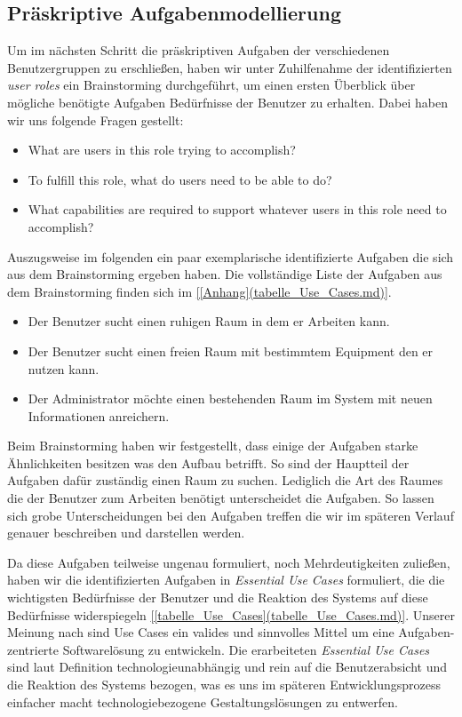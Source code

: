 \subsection{Präskriptive Aufgabenmodellierung}
\label{sec:Präskriptive_Aufgabenmodellierung}

Um im nächsten Schritt die präskriptiven Aufgaben der verschiedenen
Benutzergruppen zu erschließen, haben wir unter Zuhilfenahme der
identifizierten \textit{user roles} ein Brainstorming durchgeführt, um einen
ersten Überblick über mögliche benötigte Aufgaben \bzw Bedürfnisse der Benutzer
zu erhalten.
Dabei haben wir uns folgende Fragen gestellt:

\begin{itemize}
	\item What are users in this role trying to accomplish?
	\item To fulfill this role, what do users need to be able to do?
	\item What capabilities are required to support whatever users in this role need to accomplish?\\
	\citep[Seite 116,Zeile 7-9]{softwareForUse}
\end{itemize}


Auszugsweise im folgenden ein paar exemplarische identifizierte Aufgaben die
sich aus dem Brainstorming ergeben haben. Die vollständige Liste der Aufgaben
aus dem Brainstorming finden sich im \ref{[Anhang](tabelle_Use_Cases.md)}.

\begin{itemize}
	\item Der Benutzer sucht einen ruhigen Raum in dem er Arbeiten kann.
	\item Der Benutzer sucht einen freien Raum mit bestimmtem Equipment den er nutzen kann.
	\item Der Administrator möchte einen bestehenden Raum im System mit neuen Informationen anreichern.
\end{itemize}

Beim Brainstorming haben wir festgestellt, dass einige der Aufgaben  starke
Ähnlichkeiten besitzen was den Aufbau betrifft. So sind der Hauptteil der
Aufgaben dafür zuständig einen Raum zu suchen. Lediglich die Art des Raumes die
der Benutzer zum Arbeiten benötigt unterscheidet die Aufgaben. So lassen sich
grobe Unterscheidungen bei den Aufgaben treffen die wir im späteren Verlauf
genauer beschreiben und darstellen werden.

Da diese Aufgaben teilweise ungenau formuliert, \bzw noch Mehrdeutigkeiten
zuließen, haben wir die identifizierten Aufgaben in \textit{Essential Use Cases}
formuliert, die die wichtigsten Bedürfnisse der Benutzer und die Reaktion des
Systems auf diese Bedürfnisse widerspiegeln \ref{[tabelle_Use_Cases](tabelle_Use_Cases.md)}.
Unserer Meinung nach sind Use Cases ein valides und sinnvolles Mittel um eine
Aufgaben-zentrierte Softwarelösung zu entwickeln.
Die erarbeiteten \textit{Essential Use Cases} sind laut Definition \citep[Kapitel~5]{softwareForUse}
technologieunabhängig und rein auf die Benutzerabsicht und die Reaktion des
Systems bezogen, was es uns im späteren Entwicklungsprozess einfacher macht
technologiebezogene Gestaltungslösungen zu entwerfen.

